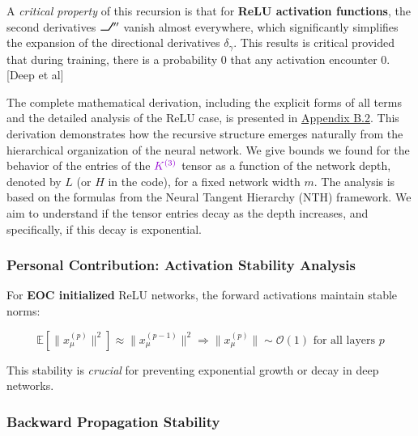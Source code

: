 \documentclass[a4paper]{article}
\DeclareRobustCommand{\ReLU}{\mathrel{\text{%
    \begin{tikzpicture}[baseline=(current bounding box.south)]
        \draw[thick] (0,0) -- (0.25,0) -- (0.4,0.25);
    \end{tikzpicture}}}\!\!}
\theoremstyle{plain}
\theoremstyle{definition}
\theoremstyle{remark}
\begin{document}
A \textit{critical property} of this recursion is that for \textbf{ReLU activation functions}, the second derivatives $\ReLU ''$ vanish almost everywhere, which significantly simplifies the expansion of the directional derivatives $\delta_\gamma$.
This results is critical provided that during training, there is a probability 0 that any activation encounter 0. [Deep et al]

The complete mathematical derivation, including the explicit forms of all terms and the detailed analysis of the ReLU case, is presented in \hyperref[sec:appendix_recursive_derivation]{Appendix B.2}. This derivation demonstrates how the recursive structure emerges naturally from the hierarchical organization of the neural network.
We give bounds we found for the behavior of the entries of the $\textcolor{k3color}{K^{(3)}}$ tensor as a function of the network depth, denoted by $L$ (or $H$ in the code), for a fixed network width $m$. The analysis is based on the formulas from the Neural Tangent Hierarchy (NTH) framework. We aim to understand if the tensor entries decay as the depth increases, and specifically, if this decay is exponential.





\subsubsection{Personal Contribution: Activation Stability Analysis}

\begin{tcolorbox}[colback=green!10,colframe=green!60!black,title={\textbf{Forward Activation Stability}},enhanced,drop shadow]
For \textbf{EOC initialized} ReLU networks, the forward activations maintain stable norms:

\begin{equation}
\label{eq:activation_stability}
\mathbb{E}[\|x^{(p)}_\mu\|^2] \approx \|x^{(p-1)}_\mu\|^2 \Rightarrow \|x^{(p)}_\mu\| \sim \mathcal{O}(1) \text{ for all layers } p
\end{equation}

This stability is \textit{crucial} for preventing exponential growth or decay in deep networks.
\end{tcolorbox}






\subsubsection{Backward Propagation Stability}
\end{document}
